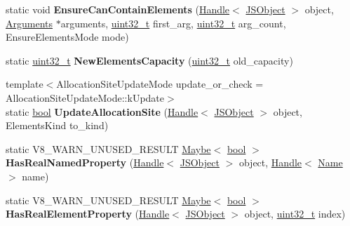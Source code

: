 \begin{DoxyCompactItemize}
static void {\bfseries Ensure\+Can\+Contain\+Elements} (\mbox{\hyperlink{classv8_1_1internal_1_1Handle}{Handle}}$<$ \mbox{\hyperlink{classv8_1_1internal_1_1JSObject}{J\+S\+Object}} $>$ object, \mbox{\hyperlink{classv8_1_1internal_1_1Arguments}{Arguments}} $\ast$arguments, \mbox{\hyperlink{classuint32__t}{uint32\+\_\+t}} first\+\_\+arg, \mbox{\hyperlink{classuint32__t}{uint32\+\_\+t}} arg\+\_\+count, Ensure\+Elements\+Mode mode)
\item 
\mbox{\label{classv8_1_1internal_1_1JSObject_ada94874ea21d5c573bf0fb4915bc346e}} 
static \mbox{\hyperlink{classuint32__t}{uint32\+\_\+t}} {\bfseries New\+Elements\+Capacity} (\mbox{\hyperlink{classuint32__t}{uint32\+\_\+t}} old\+\_\+capacity)
\item 
\mbox{\label{classv8_1_1internal_1_1JSObject_ae2ddc49dc3e760c382341536d62a0ec2}} 
{\footnotesize template$<$Allocation\+Site\+Update\+Mode update\+\_\+or\+\_\+check = Allocation\+Site\+Update\+Mode\+::k\+Update$>$ }\\static \mbox{\hyperlink{classbool}{bool}} {\bfseries Update\+Allocation\+Site} (\mbox{\hyperlink{classv8_1_1internal_1_1Handle}{Handle}}$<$ \mbox{\hyperlink{classv8_1_1internal_1_1JSObject}{J\+S\+Object}} $>$ object, Elements\+Kind to\+\_\+kind)
\item 
\mbox{\label{classv8_1_1internal_1_1JSObject_ae40588a8058db20241314b10b8bf315d}} 
static V8\+\_\+\+W\+A\+R\+N\+\_\+\+U\+N\+U\+S\+E\+D\+\_\+\+R\+E\+S\+U\+LT \mbox{\hyperlink{classv8_1_1Maybe}{Maybe}}$<$ \mbox{\hyperlink{classbool}{bool}} $>$ {\bfseries Has\+Real\+Named\+Property} (\mbox{\hyperlink{classv8_1_1internal_1_1Handle}{Handle}}$<$ \mbox{\hyperlink{classv8_1_1internal_1_1JSObject}{J\+S\+Object}} $>$ object, \mbox{\hyperlink{classv8_1_1internal_1_1Handle}{Handle}}$<$ \mbox{\hyperlink{classv8_1_1internal_1_1Name}{Name}} $>$ name)
\item 
\mbox{\label{classv8_1_1internal_1_1JSObject_a792d09543dde95abe7b8c1b8d555d9e5}} 
static V8\+\_\+\+W\+A\+R\+N\+\_\+\+U\+N\+U\+S\+E\+D\+\_\+\+R\+E\+S\+U\+LT \mbox{\hyperlink{classv8_1_1Maybe}{Maybe}}$<$ \mbox{\hyperlink{classbool}{bool}} $>$ {\bfseries Has\+Real\+Element\+Property} (\mbox{\hyperlink{classv8_1_1internal_1_1Handle}{Handle}}$<$ \mbox{\hyperlink{classv8_1_1internal_1_1JSObject}{J\+S\+Object}} $>$ object, \mbox{\hyperlink{classuint32__t}{uint32\+\_\+t}} index)

\end{DoxyCompactItemize}
